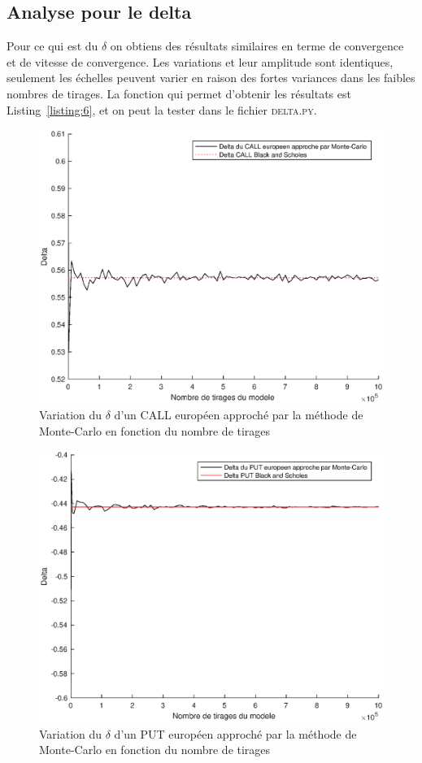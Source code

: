
\subsection{Analyse pour le delta} %
\label{sub:analyse_pour_le_delta}

Pour ce qui est du $\delta$ on obtiens des résultats similaires en terme de convergence et de vitesse de convergence. Les variations et leur amplitude sont identiques, seulement les échelles peuvent varier en raison des fortes variances dans les faibles nombres de tirages. La fonction qui permet d'obtenir les résultats est Listing~\ref{listing:6}, et on peut la tester dans le fichier \textsc{delta.py}.

\begin{figure}[H]
\centering
\includegraphics[scale=0.5]{./img/DELTA_CALL_EURO-BS.eps}
\caption{Variation du $\delta$ d'un CALL européen approché par la méthode de Monte-Carlo en fonction du nombre de tirages}
\label{fig:delta_call_euro_mc}
\end{figure}

\begin{figure}[H]
\centering
\includegraphics[scale=0.5]{./img/DELTA_PUT_EURO-BS.eps}
\caption{Variation du $\delta$ d'un PUT européen approché par la méthode de Monte-Carlo en fonction du nombre de tirages}
\label{fig:delta_put_euro_mc}
\end{figure}

